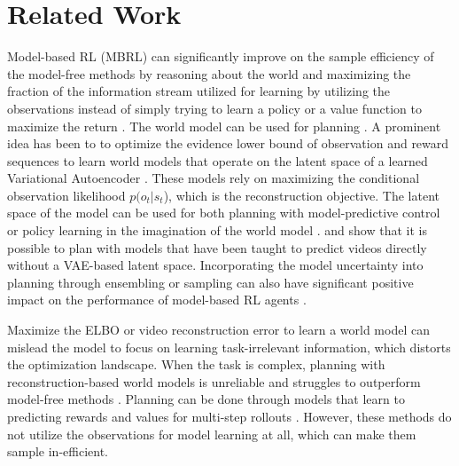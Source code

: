 \documentclass{article}
\theoremstyle{plain}
\theoremstyle{definition}
\theoremstyle{remark}
\begin{document}
\section{Related Work}
\label{sec:related_work}

Model-based RL (MBRL) can significantly improve on the sample efficiency of the model-free methods by reasoning about the world and maximizing the fraction of the information stream utilized for learning by utilizing the observations instead of simply trying to learn a policy or a value function to maximize the return \cite{haRecurrentWorldModels2018}. The world model can be used for planning \cite{allen1983planning, basye1992decision}. A prominent idea has been to to optimize the evidence lower bound of observation and reward sequences to learn world models that operate on the latent space of a learned Variational Autoencoder  \citep[VAE,][]{kingmaAutoEncoding2014, igl2018deep}. These models rely on maximizing the conditional observation likelihood $p(o_t | s_t$), which is the reconstruction objective. The latent space of the model can be used for both planning with model-predictive control \cite{rubinstein1997optimization, hafnerLearning2019} or policy learning in the imagination of the world model \cite{hafner2019dream}. \citet{finn2017deep} and \citet{ebert2018visual} show that it is possible to plan with models that have been taught to predict videos directly without a VAE-based latent space. Incorporating the model uncertainty into planning through ensembling or sampling can also have significant positive impact on the performance of model-based RL agents \cite{deisenrothPILCO2011, chua2018deep, janner2019trust, yu2020mopo, clavera2020model}.

Maximize the ELBO or video reconstruction error to learn a world model can mislead the model to focus on learning task-irrelevant information, which distorts the optimization landscape. When the task is complex, planning with reconstruction-based world models is unreliable \cite{lutter2021learning} and struggles to outperform model-free methods \cite{kostrikov2020image, yarats2021mastering}. Planning can be done through models that learn to predicting rewards and values for multi-step rollouts \cite {tamar2016value, silver2017predictron, oh2017value, schrittwieser2020mastering}. However, these methods do not utilize the observations for model learning at all, which can make them sample in-efficient.
\end{document}
